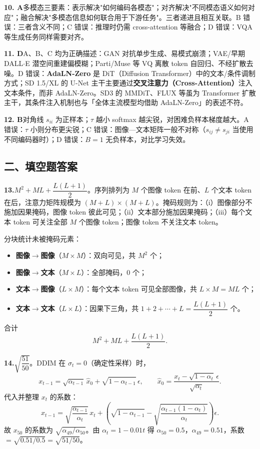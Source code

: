 \documentclass[11pt,a4paper]{article}
\begin{document}
\noindent\textbf{10. A}\quad 多模态三要素：表示解决"如何编码各模态"；对齐解决"不同模态语义如何对应"；融合解决"多模态信息如何联合用于下游任务"。三者递进且相互关联。B 错误：三者含义不同；C 错误：推理时仍需 cross-attention 等融合；D 错误：VQA 等生成任务同样需要对齐。

\noindent\textbf{11. D}\quad A、B、C 均为正确描述：GAN 对抗单步生成、易模式崩溃；VAE/早期 DALL$\cdot$E 潜空间重建偏模糊；Parti/Muse 等 VQ 离散 token 自回归、不经扩散去噪。D 错误：\textbf{AdaLN-Zero} 是 DiT（Diffusion Transformer）中的文本/条件调制方式；SD 1.5/XL 的 U-Net 主干主要通过\textbf{交叉注意力（Cross-Attention）}注入文本条件，而非 AdaLN-Zero。SD3 的 MMDiT、FLUX 等虽为 Transformer 扩散主干，其条件注入机制也与「全体主流模型均借助 AdaLN-Zero」的表述不符。

\noindent\textbf{12. B}\quad 对角线 $s_{ii}$ 为正样本；$\tau$ 越小 softmax 越尖锐，对困难负样本梯度越大。A 错误：$\tau$ 小则分布更尖锐；C 错误：图像—文本矩阵一般不对称（$s_{ij}\neq s_{ji}$ 当使用不同编码器时）；D 错误：$B=1$ 无负样本，对比学习失效。

\subsection*{\heiti 二、填空题答案}

\noindent\textbf{13.}\quad $M^2+ML+\dfrac{L(L+1)}{2}$。序列排列为 $M$ 个图像 token 在前、$L$ 个文本 token 在后，注意力矩阵规模为 $(M+L)\times(M+L)$。掩码规则为：（i）图像部分不施加因果掩码，图像 token 彼此可见；（ii）文本部分施加因果掩码；（iii）每个文本 token 可关注全部 $M$ 个图像 token；图像 token 不关注文本 token。

分块统计未被掩码元素：
\begin{itemize}[leftmargin=2em,itemsep=0pt,parsep=0pt,topsep=0pt]
  \item \textbf{图像$\to$图像}（$M\times M$）：双向可见，共 $M^2$ 个；
  \item \textbf{图像$\to$文本}（$M\times L$）：全部掩码，$0$ 个；
  \item \textbf{文本$\to$图像}（$L\times M$）：每个文本 token 可见全部图像，共 $L\times M=ML$ 个；
  \item \textbf{文本$\to$文本}（$L\times L$）：因果下三角，共 $1+2+\cdots+L=\dfrac{L(L+1)}{2}$ 个。
\end{itemize}
合计
\[
M^2+ML+\frac{L(L+1)}{2}.
\]

\noindent\textbf{14.}\quad $\sqrt{\dfrac{51}{50}}$。DDIM 在 $\sigma_t=0$（确定性采样）时，
\[
x_{t-1}=\sqrt{\alpha_{t-1}}\,\hat x_0+\sqrt{1-\alpha_{t-1}}\,\epsilon,\qquad
\hat x_0=\frac{x_t-\sqrt{1-\alpha_t}\,\epsilon}{\sqrt{\alpha_t}}.
\]
代入并整理 $x_t$ 的系数：
\[
x_{t-1}=\sqrt{\frac{\alpha_{t-1}}{\alpha_t}}\,x_t+\left(\sqrt{1-\alpha_{t-1}}-\sqrt{\frac{\alpha_{t-1}(1-\alpha_t)}{\alpha_t}}\right)\epsilon.
\]
故 $x_{50}$ 的系数为 $\sqrt{\alpha_{49}/\alpha_{50}}$。由 $\alpha_t=1-0.01t$ 得 $\alpha_{50}=0.5$，$\alpha_{49}=0.51$，系数 $=\sqrt{0.51/0.5}=\sqrt{51/50}$。
\end{document}
